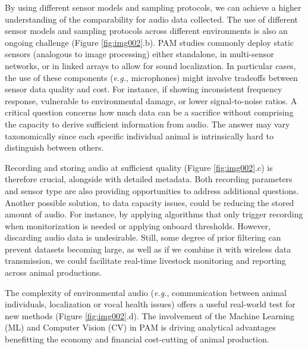 By using different sensor models and sampling protocols, we can achieve a higher understanding of the comparability for audio data collected.
The use of different sensor models and sampling protocols across different environments is also an ongoing challenge (Figure \ref{fig:img002}.b).
PAM studies commonly deploy static sensors (analogous to image processing) either standalone, in multi-sensor networks, or in linked arrays to allow for sound localization.
In particular cases, the use of these components ({\em e.g.}, microphones) might involve tradeoffs between sensor data quality and cost.
For instance, if showing inconsistent frequency response, vulnerable to environmental damage, or lower signal-to-noise ratios.
A critical question concerns how much data can be a sacrifice without comprising the capacity to derive sufficient information from audio.
The answer may vary taxonomically since each specific individual animal is intrinsically hard to distinguish between others.

\break

Recording and storing audio at sufficient quality (Figure \ref{fig:img002}.c) is therefore crucial, alongside with detailed metadata.
Both recording parameters and sensor type are also providing opportunities to address additional questions.
Another possible solution, to data capacity issues, could be reducing the stored amount of audio.
For instance, by applying algorithms that only trigger recording when monitorization is needed or applying onboard thresholds.
However, discarding audio data is undesirable.
Still, some degree of prior filtering can prevent datasets becoming large, as well as if we combine it with wireless data transmission, we could facilitate real-time livestock monitoring and reporting across animal productions.

The complexity of environmental audio ({\em e.g.}, communication between animal individuals, localization or vocal health issues) offers a useful real-world test for new methods (Figure \ref{fig:img002}.d).
The involvement of the Machine Learning (ML) and Computer Vision (CV) in PAM is driving analytical advantages benefitting the economy and financial cost-cutting of animal production.

